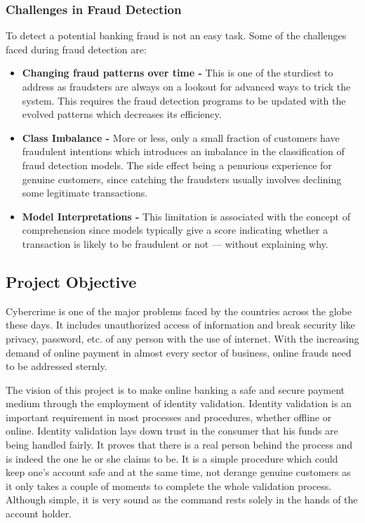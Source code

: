 \documentclass[12pt, oneside, a4paper]{article}
\begin{document}
\subsubsection{Challenges in Fraud Detection}
To detect a potential banking fraud is not an easy task. Some of the challenges faced during fraud detection are:
\begin{itemize}
    \item \textbf{Changing fraud patterns over time - }This is one of the sturdiest to address as fraudsters are always on a lookout for advanced ways to trick the system. This requires the fraud detection programs to be updated with the evolved patterns which decreases its efficiency.
    \item \textbf{Class Imbalance - }More or less, only a small fraction of customers have fraudulent intentions which introduces an imbalance in the classification of fraud detection models. The side effect being a penurious experience for genuine customers, since catching the fraudsters usually involves declining some legitimate transactions.
    \item \textbf{Model Interpretations - }This limitation is associated with the concept of comprehension since models typically give a score indicating whether a transaction is likely to be fraudulent or not — without explaining why.
\end{itemize}
\pagebreak
\subsection{Project Objective}
Cybercrime is one of the major problems faced by the countries across the globe these days. It includes unauthorized access of information and break security like privacy, password, etc. of any person with the use of internet. With the increasing demand of online payment in almost every sector of business, online frauds need to be addressed sternly. 

The vision of this project is to make online banking a safe and secure payment medium through the employment of identity validation. Identity validation is an important requirement in most processes and procedures, whether offline or online. Identity validation lays down trust in the consumer that his funds are being handled fairly. It proves that there is a real person behind the process and is indeed the one he or she claims to be. It is a simple procedure which could keep one's account safe and at the same time, not derange genuine customers as it only takes a couple of moments to complete the whole validation process. Although simple, it is very sound as the command rests solely in the hands of the account holder.
\end{document}
